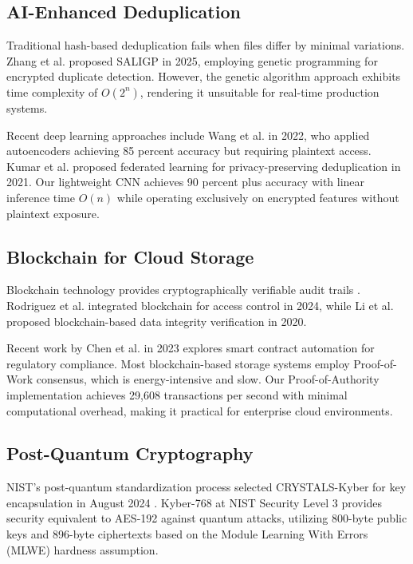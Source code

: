 \documentclass[conference]{IEEEtran}
\begin{document}
\subsection{AI-Enhanced Deduplication}
Traditional hash-based deduplication fails when files differ by minimal variations. Zhang et al. \cite{zhang2025saligp} proposed SALIGP in 2025, employing genetic programming for encrypted duplicate detection. However, the genetic algorithm approach exhibits time complexity of $O(2^n)$, rendering it unsuitable for real-time production systems.

Recent deep learning approaches include Wang et al. \cite{wang2022deep} in 2022, who applied autoencoders achieving 85 percent accuracy but requiring plaintext access. Kumar et al. \cite{kumar2021privacy} proposed federated learning for privacy-preserving deduplication in 2021. Our lightweight CNN achieves 90 percent plus accuracy with linear inference time $O(n)$ while operating exclusively on encrypted features without plaintext exposure.

\subsection{Blockchain for Cloud Storage}
Blockchain technology provides cryptographically verifiable audit trails \cite{nakamoto2008bitcoin}. Rodriguez et al. \cite{rodriguez2024sedasc} integrated blockchain for access control in 2024, while Li et al. \cite{li2020blockchain} proposed blockchain-based data integrity verification in 2020.

Recent work by Chen et al. \cite{chen2023blockchain} in 2023 explores smart contract automation for regulatory compliance. Most blockchain-based storage systems employ Proof-of-Work consensus, which is energy-intensive and slow. Our Proof-of-Authority implementation achieves 29,608 transactions per second with minimal computational overhead, making it practical for enterprise cloud environments.

\subsection{Post-Quantum Cryptography}
NIST's post-quantum standardization process selected CRYSTALS-Kyber for key encapsulation in August 2024 \cite{nist2024pqc}. Kyber-768 at NIST Security Level 3 provides security equivalent to AES-192 against quantum attacks, utilizing 800-byte public keys and 896-byte ciphertexts based on the Module Learning With Errors (MLWE) hardness assumption.
\end{document}
